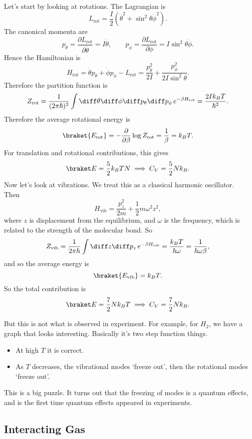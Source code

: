 \documentclass[12pt]{article}
\begin{document}
Let's start by looking at rotations. The Lagrangian is
\[
L_{\mathrm{rot}} = \frac{I}{2}(\dot \theta^2 + \sin^2 \theta \dot \phi^2).
\]
The canonical momenta are
\[
p_\theta = \frac{\partial L_{\mathrm{rot}}}{\partial \dot \theta} = I \dot \theta, \qquad p_\phi = \frac{\partial L_{\mathrm{rot}}}{\partial \phi} = I \sin^2 \theta \dot \phi.
\]
Hence the Hamiltonian is
\[
H_{\mathrm{rot}} = \dot \theta p_\theta + \dot \phi p_\phi - L_{\mathrm{rot}} = \frac{p_\theta^2}{2I} + \frac{p_\phi^2}{2I \sin^2\theta}.
\]
Therefore the partition function is
\[
Z_{\mathrm{rot}} = \frac{1}{(2\pi\hbar)^2} \int \diff \theta \diff \phi \diff p_\theta \diff p_\phi\, e^{-\beta H_{\mathrm{rot}}} = \frac{2I k_B T}{\hbar^2}.
\]
Therefore the average rotational energy is
\[
	\braket{E_{\mathrm{rot}}}= - \frac{\partial}{\partial \beta} \log Z_{\mathrm{rot}} = \frac{1}{\beta} = k_B T.
\]
For translation and rotational contributions, this gives
\[
\braket E = \frac{5}{2} k_B T N \implies C_V = \frac{5}{2} N k_B.
\]
Now let's look at vibrations. We treat this as a classical harmonic oscillator. Then
\[
H_{\mathrm{vib}} = \frac{p_z^2}{2m} + \frac{1}{2} m \omega^2z^2,
\]
where $z$ is displacement from the equilibrium, and $\omega$ is the frequency, which is related to the strength of the molecular bond. So
\[
Z_{\mathrm{vib}} = \frac{1}{2 \pi \hbar} \int \diff z \diff p_z \, e^{-\beta H_{\mathrm{vib}}} = \frac{k_B T}{\hbar \omega} = \frac{1}{\hbar \omega \beta},
\]
and so the average energy is
\[
	\braket{E_{\mathrm{vib}}} = k_B T.
\]
So the total contribution is
\[
\braket E = \frac{7}{2} N k_B T \implies C_V = \frac{7}{2} N k_B.
\]


But this is not what is observed in experiment. For example, for $H_2$, we have a graph that looks interesting. Basically it's two step function things.
\begin{itemize}
	\item At high $T$ it is correct.
	\item As  $T$ decreases, the vibrational modes `freeze out', then the rotational modes `freeze out'.
\end{itemize}

This is a big puzzle. It turns out that the freezing of modes is a quantum effects, and is the first time quantum effects appeared in experiments.

\subsection{Interacting Gas}
\label{sub_int_gas}
\end{document}
